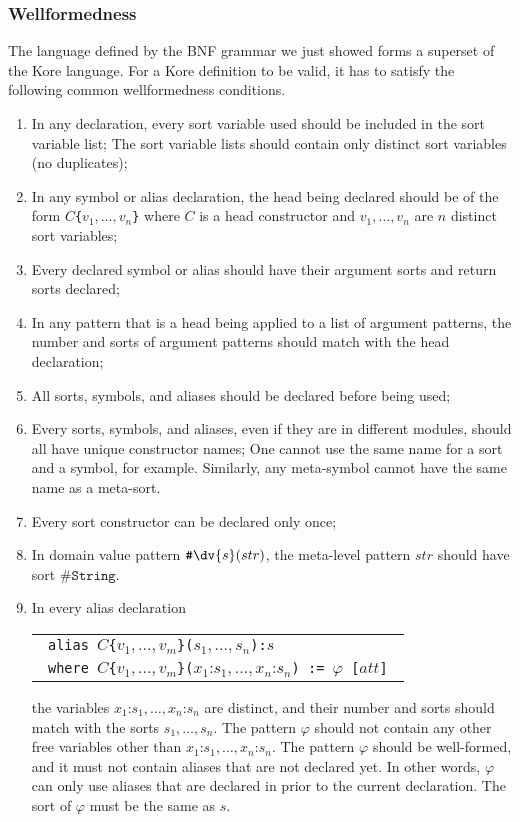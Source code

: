 \documentclass[UTF8,11pt]{article}
\theoremstyle{plain}
\theoremstyle{definition}
\theoremstyle{remark}
\newcommand{\cln}{\texttt{:}}
\newcommand{\sharpsymbol}{\#}
\newcommand{\KString}{\texttt{\sharpsymbol String}}
\newcommand{\Kdv}{\texttt{\sharpsymbol \slashsymbol dv}}
\newcommand{\slashsymbol}{\symbol{92}}
\begin{document}
\subsubsection{Wellformedness}
\label{sec:kore-syntax-wellformedness}
The language defined by the BNF grammar we just showed forms a superset of the 
Kore language.
For a Kore definition to be valid, it has to satisfy the following common 
wellformedness conditions.
\begin{enumerate}\itemsep0em
\item In any declaration, every sort variable used should be included in the
sort variable list; The sort variable lists should contain only distinct sort 
variables (no duplicates);
\item In any symbol or alias declaration, the head being declared should be of 
the form \texttt{$C$\{$v_1,\dots,v_n$\}} where $C$ is a head constructor and 
$v_1,\dots,v_n$ are $n$ distinct sort variables;
\item Every declared symbol or alias should have their argument sorts and 
return sorts declared;
\item In any pattern that is a head being applied to a list of argument 
patterns, the number and sorts of argument patterns should match with the head 
declaration;
\item All sorts, symbols, and aliases should be declared before being used;
\item Every sorts, symbols, and aliases, even if they are in different modules, 
should all have unique constructor 
names; One cannot use the same name for a sort and a symbol, for example. 
Similarly, any meta-symbol cannot have the same name as a meta-sort.
\item Every sort constructor can be declared only once;
\item In domain value pattern $\Kdv\{s\}(str)$, the meta-level pattern $str$ 
should have sort $\KString$.
\item In every alias declaration
      \begin{center}
      \begin{tabular}{l}
      \texttt{
      alias $C$\{$v_1,\dots,v_m$\}($s_1,\dots,s_n$):$s$
      }\\
      \texttt{
      where $C$\{$v_1,\dots,v_m$\}($x_1 \cln s_1,\dots,x_n \cln s_n$)
      := $\varphi$ [$att$]
      }
      \end{tabular}
      \end{center}
      the variables $x_1 \cln s_1,\dots,x_n \cln s_n$ are distinct, and
      their number and sorts should match with the sorts
      $s_1 ,\dots, s_n$.
      The pattern $\varphi$ should  not contain any other free variables
      other than $x_1 \cln s_1,\dots,x_n \cln s_n$.
      The pattern $\varphi$ should be well-formed, and it must not
      contain aliases that are not declared yet.
      In other words, $\varphi$ can only use aliases that are declared
      in prior to the current declaration. 
      The sort of $\varphi$ must be the same as $s$.
\end{enumerate}
\end{document}
